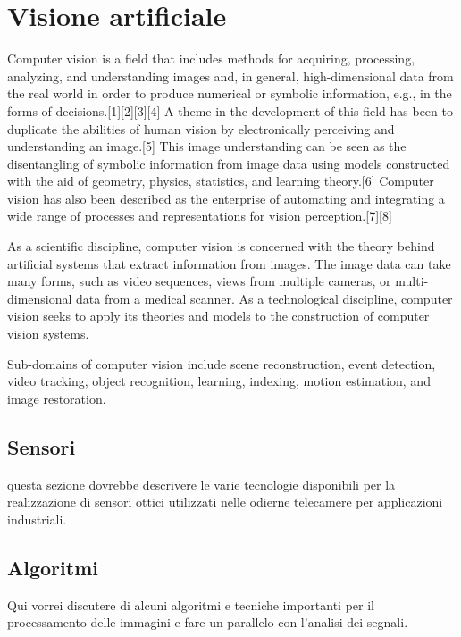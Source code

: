 \chapter{Visione artificiale}

Computer vision is a field that includes methods for acquiring, processing, analyzing, and understanding images and, in general, high-dimensional data from the real world in order to produce numerical or symbolic information, e.g., in the forms of decisions.[1][2][3][4] A theme in the development of this field has been to duplicate the abilities of human vision by electronically perceiving and understanding an image.[5] This image understanding can be seen as the disentangling of symbolic information from image data using models constructed with the aid of geometry, physics, statistics, and learning theory.[6] Computer vision has also been described as the enterprise of automating and integrating a wide range of processes and representations for vision perception.[7][8]

As a scientific discipline, computer vision is concerned with the theory behind artificial systems that extract information from images. The image data can take many forms, such as video sequences, views from multiple cameras, or multi-dimensional data from a medical scanner. As a technological discipline, computer vision seeks to apply its theories and models to the construction of computer vision systems.

Sub-domains of computer vision include scene reconstruction, event detection, video tracking, object recognition, learning, indexing, motion estimation, and image restoration.






\section{Sensori}

questa sezione dovrebbe descrivere le varie tecnologie disponibili per la realizzazione di
sensori ottici utilizzati nelle odierne telecamere per applicazioni industriali.

\section{Algoritmi}
Qui vorrei discutere di alcuni algoritmi e tecniche importanti per il processamento delle immagini
e fare un parallelo con l'analisi dei segnali.

